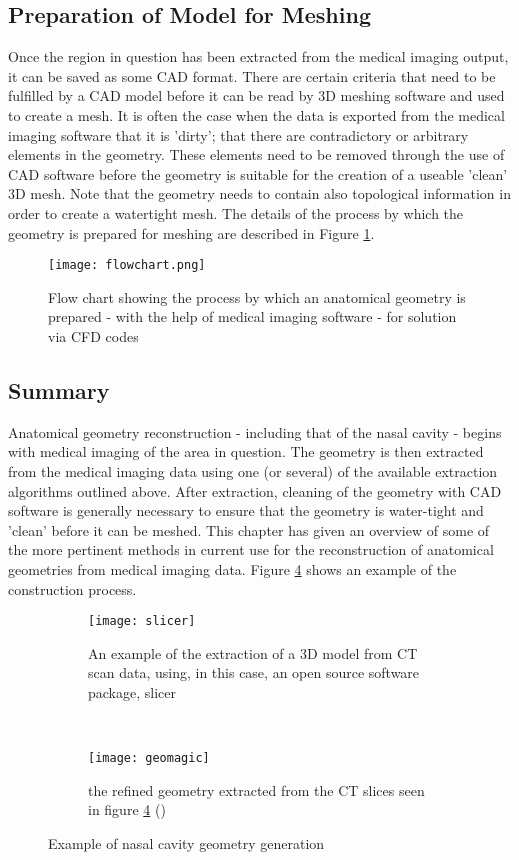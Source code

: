\subsection{Preparation of Model for Meshing}

Once the region in question has been extracted from the medical imaging output, it can be saved as some CAD format. There are certain criteria that need to be fulfilled by a CAD model before it can be read by 3D meshing software and used to create a mesh. It is often the case when the data is exported from the medical imaging software that it is 'dirty'; that there are contradictory or arbitrary elements in the geometry. These elements need to be removed through the use of CAD software before the geometry is suitable for the creation of a useable 'clean' 3D mesh. Note that the geometry needs to contain also topological information in order to create a watertight mesh. The details of the process by which the geometry is prepared for meshing are described in Figure \ref{fig:segchart}.


\begin{figure}
  \texttt{[image: flowchart.png]}
\caption{Flow chart showing the process by which an anatomical geometry is prepared - with the help of medical imaging software - for solution via CFD codes} \label{fig:segchart}
\centering
\end{figure}
 
\subsection{Summary} 

Anatomical geometry reconstruction - including that of the nasal cavity - begins with medical imaging of the area in question. The geometry is then extracted from the medical imaging data using one (or several) of the available extraction algorithms outlined above. After extraction, cleaning of the geometry with CAD software is generally necessary to ensure that the geometry is water-tight and 'clean' before it can be meshed. This chapter has given an overview of some of the more pertinent methods in current use for the reconstruction of anatomical geometries from medical imaging data. Figure \ref{fig:cavzamp} shows an example of the construction process.

\begin{figure}[t!]

  \begin{subfigure}[t]{0.5\textwidth} 
    \texttt{[image: slicer]}
    \caption{An example of the extraction of a 3D model from CT scan data, using, in this case, an open source software package, slicer}
    \label{fig:slicer}
  \end{subfigure}%
  ~ %
  \begin{subfigure}[t]{0.5\textwidth} 
    \texttt{[image: geomagic]}
    \caption{the refined geometry extracted from the CT slices seen in figure \ref{fig:cavzamp} ()}
    \label{fig:geomag}
  \end{subfigure}

  \caption{Example of nasal cavity geometry generation}
  \label{fig:cavzamp}
\end{figure}
 
